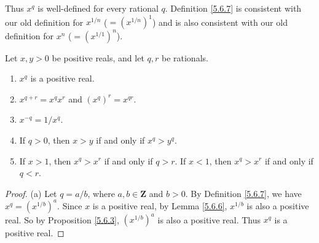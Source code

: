 \begin{note}
    Thus \(x^q\) is well-defined for every rational \(q\).
    Definition \ref{5.6.7} is consistent with our old definition for \(x^{1 / n}\) (\(= (x^{1 / n})^1\)) and is also consistent with our old definition for \(x^n\) (\(= (x^{1 / 1})^n\)).
\end{note}

\begin{lemma}\label{5.6.9}
    Let \(x, y > 0\) be positive reals, and let \(q, r\) be rationals.
    \begin{enumerate}
        \item \(x^q\) is a positive real.
        \item \(x^{q + r} = x^q x^r\) and \((x^q)^r = x^{qr}\).
        \item \(x^{-q} = 1 / x^q\).
        \item If \(q > 0\), then \(x > y\) if and only if \(x^q > y^q\).
        \item If \(x > 1\), then \(x^q > x^r\) if and only if \(q > r\).
              If \(x < 1\), then \(x^q > x^r\) if and only if \(q < r\).
    \end{enumerate}
\end{lemma}

\begin{proof}{(a)}
    Let \(q = a / b\), where \(a, b \in \mathbf{Z}\) and \(b > 0\).
    By Definition \ref{5.6.7}, we have \(x^q = (x^{1 / b})^a\).
    Since \(x\) is a positive real, by Lemma \ref{5.6.6}, \(x^{1 / b}\) is also a positive real.
    So by Proposition \ref{5.6.3}, \((x^{1 / b})^a\) is also a positive real.
    Thus \(x^q\) is a positive real.
\end{proof}

